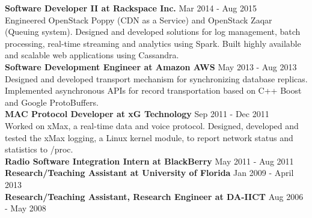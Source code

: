 \begin{resume}
\textbf{Software Developer II at Rackspace Inc.} \hfill Mar 2014 - Aug 2015\\
Engineered OpenStack Poppy (CDN as a Service) and OpenStack Zaqar (Queuing system). Designed and developed solutions for log management, batch processing, real-time streaming and analytics using Spark. Built highly available and scalable web applications using Cassandra.\\
\textbf{Software Development Engineer at Amazon AWS} \hfill May 2013 - Aug 2013\\
Designed and developed transport mechanism for synchronizing database replicas. Implemented asynchronous APIs for record transportation based on C++ Boost and Google ProtoBuffers.\\
\textbf{MAC Protocol Developer at xG Technology} \hfill Sep 2011 - Dec 2011\\
Worked on xMax, a real-time data and voice protocol. Designed, developed and tested the xMax logging, a Linux kernel module, to report network status and statistics to /proc.\\
\textbf{Radio Software Integration Intern at BlackBerry} \hfill May 2011 - Aug 2011\\
\textbf{Research/Teaching Assistant at University of Florida} \hfill Jan 2009 - April 2013\\
\textbf{Research/Teaching Assistant, Research Engineer at DA-IICT} \hfill Aug 2006 - May 2008

\begin{formatb}
  \\
  \body\\
\end{formatb}


\end{resume}
